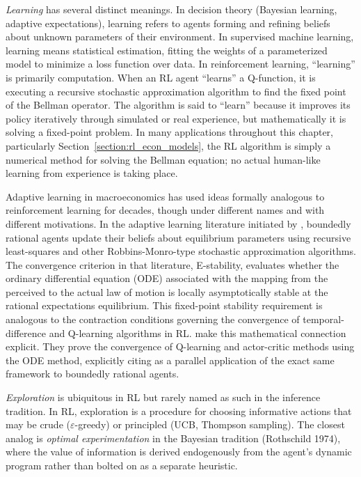 \textit{Learning} has several distinct meanings. In decision theory (Bayesian learning, adaptive expectations), learning refers to agents forming and refining beliefs about unknown parameters of their environment. In supervised machine learning, learning means statistical estimation, fitting the weights of a parameterized model to minimize a loss function over data. In reinforcement learning, ``learning'' is primarily computation. When an RL agent ``learns'' a Q-function, it is executing a recursive stochastic approximation algorithm to find the fixed point of the Bellman operator. The algorithm is said to ``learn'' because it improves its policy iteratively through simulated or real experience, but mathematically it is solving a fixed-point problem. In many applications throughout this chapter, particularly Section~\ref{section:rl_econ_models}, the RL algorithm is simply a numerical method for solving the Bellman equation; no actual human-like learning from experience is taking place.

Adaptive learning in macroeconomics has used ideas formally analogous to reinforcement learning for decades, though under different names and with different motivations. In the adaptive learning literature initiated by \citet{MarcetSargent1989}, boundedly rational agents update their beliefs about equilibrium parameters using recursive least-squares and other Robbins-Monro-type stochastic approximation algorithms. The convergence criterion in that literature, E-stability, evaluates whether the ordinary differential equation (ODE) associated with the mapping from the perceived to the actual law of motion is locally asymptotically stable at the rational expectations equilibrium. This fixed-point stability requirement is analogous to the contraction conditions governing the convergence of temporal-difference and Q-learning algorithms in RL. \citet{borkar2000} make this mathematical connection explicit. They prove the convergence of Q-learning and actor-critic methods using the ODE method, explicitly citing \citet{Sargent1993} as a parallel application of the exact same framework to boundedly rational agents.

\textit{Exploration} is ubiquitous in RL but rarely named as such in the inference tradition. In RL, exploration is a procedure for choosing informative actions that may be crude ($\varepsilon$-greedy) or principled (UCB, Thompson sampling). The closest analog is \textit{optimal experimentation} in the Bayesian tradition (Rothschild 1974), where the value of information is derived endogenously from the agent's dynamic program rather than bolted on as a separate heuristic.

